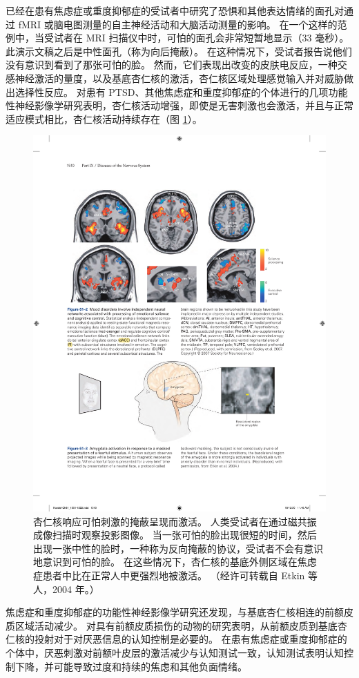已经在患有焦虑症或重度抑郁症的受试者中研究了恐惧和其他表达情绪的面孔对通过 fMRI 或脑电图测量的自主神经活动和大脑活动测量的影响。 在一个这样的范例中，当受试者在 MRI 扫描仪中时，可怕的面孔会非常短暂地显示（33 毫秒）。 此演示文稿之后是中性面孔（称为向后掩蔽）。 在这种情况下，受试者报告说他们没有意识到看到了那张可怕的脸。 然而，它们表现出改变的皮肤电反应，一种交感神经激活的量度，以及基底杏仁核的激活，杏仁核区域处理感觉输入并对威胁做出选择性反应。 对患有 PTSD、其他焦虑症和重度抑郁症的个体进行的几项功能性神经影像学研究表明，杏仁核活动增强，即使是无害刺激也会激活，并且与正常适应模式相比，杏仁核活动持续存在（图 \ref{fig:61_3}）。

\begin{figure}[htbp]
	\centering
	\includegraphics[width=0.8\linewidth]{chap61/fig_61_3}
	\caption{杏仁核响应可怕刺激的掩蔽呈现而激活。 人类受试者在通过磁共振成像扫描时观察投影图像。 当一张可怕的脸出现很短的时间，然后出现一张中性的脸时，一种称为反向掩蔽的协议，受试者不会有意识地意识到可怕的脸。 在这些情况下，杏仁核的基底外侧区域在焦虑症患者中比在正常人中更强烈地被激活。 （经许可转载自 Etkin 等人，2004 年。）}
	\label{fig:61_3}
\end{figure}

焦虑症和重度抑郁症的功能性神经影像学研究还发现，与基底杏仁核相连的前额皮质区域活动减少。 对具有前额皮质损伤的动物的研究表明，从前额皮质到基底杏仁核的投射对于对厌恶信息的认知控制是必要的。 在患有焦虑症或重度抑郁症的个体中，厌恶刺激对前额叶皮层的激活减少与认知测试一致，认知测试表明认知控制下降，并可能导致过度和持续的焦虑和其他负面情绪。


